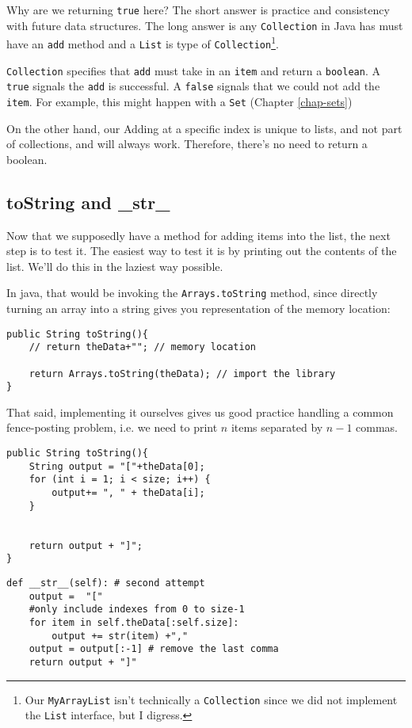 Why are we returning \texttt{true} here?
The short answer is practice and consistency with future data structures.
The long answer is any \texttt{Collection} in Java has must have an \texttt{add} method and a \texttt{List} is type of \texttt{Collection}\footnote{Our \texttt{MyArrayList} isn't technically a \texttt{Collection} since we did not implement the \texttt{List} interface, but I digress.}.

\texttt{Collection} specifies that \texttt{add} must take in an \texttt{item} and return a \texttt{boolean}.
A \texttt{true} signals the \texttt{add} is successful.
A \texttt{false} signals that we could not add the \texttt{item}.
For example, this might happen with a \texttt{Set} (Chapter \ref{chap-sets})


On the other hand, our Adding at a specific index is unique to lists, and not part of collections,  and will always work. Therefore, there's no need to return a boolean. 


\subsection{toString and \_str\_}
Now that we supposedly have a method for adding items into the list, the next step is to test it.  
The easiest way to test it is by printing out the contents of the list.  
We'll do this in the laziest way possible.



In java, that would be invoking the \texttt{Arrays.toString} method, since directly turning an array into a string gives you representation of the memory location:
\begin{verbatim}
public String toString(){
	// return theData+""; // memory location
	
	return Arrays.toString(theData); // import the library 
}
\end{verbatim}

That said, implementing it ourselves gives us good practice handling a common fence-posting problem, i.e. we need to print $n$ items separated by $n-1$ commas.
\begin{verbatim}
public String toString(){
	String output = "["+theData[0];
	for (int i = 1; i < size; i++) {
		output+= ", " + theData[i];
	}
	
	
	return output + "]";
}
\end{verbatim}

\begin{verbatim}
def __str__(self): # second attempt
	output =  "["
	#only include indexes from 0 to size-1
	for item in self.theData[:self.size]:
		output += str(item) +","
	output = output[:-1] # remove the last comma
	return output + "]"

\end{verbatim}


